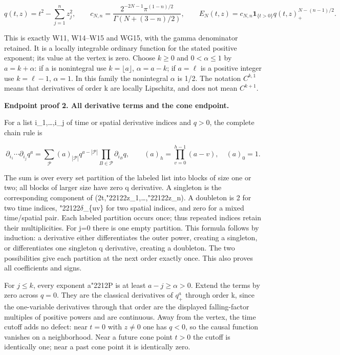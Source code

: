 \documentclass[
  11pt,
]{article}
\begin{document}
\[
 q(t,z)=t^2-\sum_{j=1}^n z_j^2,\qquad
 c_{N,n}=\frac{2^{-2N-1}\pi^{(1-n)/2}}{\Gamma(N+(3-n)/2)},\qquad
 E_N(t,z)=c_{N,n}\boldsymbol1_{\{t>0\}}q(t,z)_+^{N-(n-1)/2}.
 \tag{EH1}
\]

This is exactly W11, W14--W15 and WG15, with the gamma denominator
retained. It is a locally integrable ordinary function for the stated
positive exponent; its value at the vertex is zero. Choose \(k\geq 0\)
and \(0<\alpha \leq 1\) by \(a=k+\alpha \): if a is nonintegral use
\(k=\lfloor a\rfloor\), \(\alpha =a-k\); if \(a=\ell \) is a positive
integer use \(k=\ell -1\), \(\alpha =1\). In this family the nonintegral
\ensuremath{\alpha} is 1/2. The notation \(C^{k,1}\) means that derivatives of order k are
locally Lipschitz, and does not mean \(C^{k+1}\).

\textbf{Endpoint proof 2. All derivative terms and the cone endpoint.}

For a list i\_1,\ldots,i\_j of time or spatial derivative indices and
\(q>0\), the complete chain rule is

\[
 \partial_{i_1}\cdots\partial_{i_j}q^a
 =\sum_{\mathcal P}(a)_{|\mathcal P|}
       q^{a-|\mathcal P|}\prod_{B\in\mathcal P}\partial_{i_B}q,
 \qquad (a)_h=\prod_{v=0}^{h-1}(a-v),\quad(a)_0=1.
 \tag{EH2}
\]

The sum is over every set partition of the labeled list into blocks of
size one or two; all blocks of larger size have zero q derivative. A
singleton is the corresponding component of (2t,{\ReaderSymbols\char"2212}2z\_1,\ldots,{\ReaderSymbols\char"2212}2z\_n). A
doubleton is 2 for two time indices, {\ReaderSymbols\char"2212}2\ensuremath{\delta}\_\{uv\} for two spatial
indices, and zero for a mixed time/spatial pair. Each labeled partition
occurs once; thus repeated indices retain their multiplicities. For j=0
there is one empty partition. This formula follows by induction: a
derivative either differentiates the outer power, creating a singleton,
or differentiates one singleton q derivative, creating a doubleton. The
two possibilities give each partition at the next order exactly once.
This also proves all coefficients and signs.

For \(j\leq k\), every exponent a{\ReaderSymbols\char"2212}\textbar P\textbar{} is at least
\(a-j\geq \alpha >0\). Extend the terms by zero across \(q=0\). They are
the classical derivatives of \(q_+^a\) through order k, since the
one-variable derivatives through that order are the displayed
falling-factor multiples of positive powers and are continuous. Away
from the vertex, the time cutoff adds no defect: near \(t=0\) with
\(z\ne 0\) one has \(q<0\), so the causal function vanishes on a
neighborhood. Near a future cone point \(t>0\) the cutoff is identically
one; near a past cone point it is identically zero.
\end{document}

